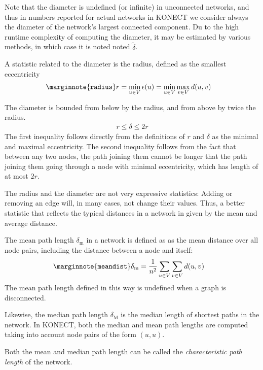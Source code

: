 \documentclass{article}
\begin{document}
Note that the diameter is undefined (or infinite) in unconnected
networks, and thus in numbers reported for actual networks in KONECT we
consider always the diameter of the network's largest connected
component.  Du to the high runtime complexity of computing the diameter,
it may be estimated by various methods, in which case it is noted noted
$\tilde \delta$.

A statistic related to the diameter is the radius, defined as the
smallest eccentricity
\begin{align}
  \marginnote{\texttt{radius}} r &= \min_{u \in V} \epsilon(u) = \min_{u
    \in V} \max_{v \in V} d(u,v)
\end{align}

The diameter is bounded from below by the radius, and from above by
twice the radius.  
\begin{align*}
  r \leq \delta \leq 2r
\end{align*}
The first inequality follows directly from the definitions of $r$ and
$\delta$ as the minimal and maximal eccentricity.  The second inequality
follows from the fact that between any two nodes, the path joining them
cannot be longer that the path joining them going through a node with
minimal eccentricity, which has length of at most $2r$. 

The radius and the diameter are not very expressive statistics: Adding
or removing an edge will, in many cases, not change their values.  Thus,
a better statistic that reflects the typical distances in a network in
given by the mean and average distance.

The mean path length $\delta_{\mathrm m}$ in a network is defined as as
the mean distance over all node pairs, including the distance between a
node and itself:
\begin{align}
  \marginnote{\texttt{meandist}} \delta_{\mathrm m} &= \frac 1 {n^2}
  \sum_{u \in V} \sum_{v\in V} d(u,v)
\end{align}
The mean path length defined in this way is undefined when a graph is
disconnected.

Likewise, the median path length $\delta_{\mathrm M}$ is the median
length of shortest paths in the network.  In KONECT, both the median and
mean path lengths are computed taking into account node pairs of the
form $(u,u)$.

Both the mean and median path length can be called the
\emph{characteristic path length} of the network.
\end{document}
